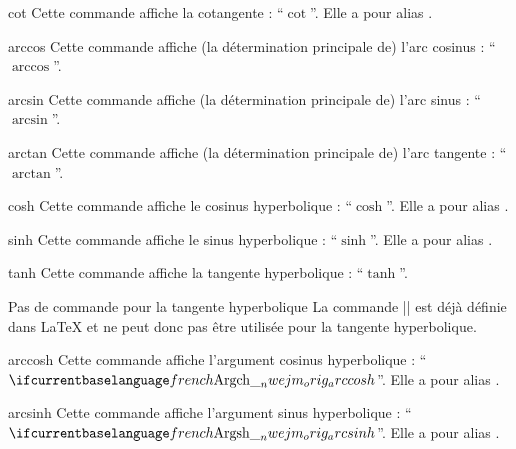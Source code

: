 \documentclass[french,nolocaltoc]{nwejmart}
\newtheorem[title=Fait,style=definition]{fact}
\begin{document}
\begin{docCommand}{cot}{}
  Cette commande affiche la cotangente : \enquote{$\cot$}. Elle a pour alias
  .
\end{docCommand}

\begin{docCommand}{arccos}{}
  Cette commande affiche (la détermination principale de) l'arc cosinus :
  \enquote{$\arccos$}.
\end{docCommand}

\begin{docCommand}{arcsin}{}
  Cette commande affiche (la détermination principale de) l'arc sinus :
  \enquote{$\arcsin$}.
\end{docCommand}

\begin{docCommand}{arctan}{}
  Cette commande affiche (la détermination principale de) l'arc tangente :
  \enquote{$\arctan$}.
\end{docCommand}

\begin{docCommand}{cosh}{}
  Cette commande affiche le cosinus hyperbolique : \enquote{$\cosh$}. Elle a pour
  alias .
\end{docCommand}

\begin{docCommand}{sinh}{}
  Cette commande affiche le sinus hyperbolique : \enquote{$\sinh$}. Elle a pour
  alias .
\end{docCommand}

\begin{docCommand}{tanh}{}
  Cette commande affiche la tangente hyperbolique : \enquote{$\tanh$}.
  \begin{dbremark}{Pas de commande \protect{} pour la tangente hyperbolique}{}
    La commande |\th| est déjà définie dans \LaTeX{} et ne peut donc pas être
    utilisée pour la tangente hyperbolique.
  \end{dbremark}
\end{docCommand}

\begin{docCommand}{arccosh}{}
  Cette commande affiche l'argument cosinus hyperbolique :
  \enquote{$\arccosh$}. Elle a pour alias .
\end{docCommand}

\begin{docCommand}{arcsinh}{}
  Cette commande affiche l'argument sinus hyperbolique :
  \enquote{$\arcsinh$}. Elle a pour alias .
\end{docCommand}
\end{document}
